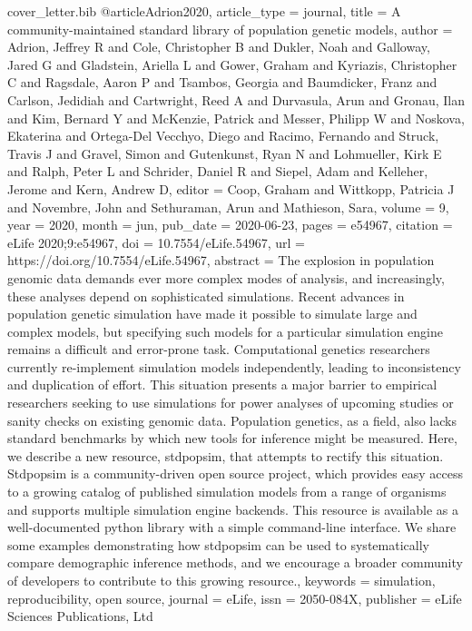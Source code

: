 \begin{filecontents}{cover_letter.bib}
@article{Adrion2020,
  article_type = {journal},
  title        = {A community-maintained standard library of population genetic models},
  author       = {Adrion, Jeffrey R and Cole, Christopher B and Dukler, Noah and Galloway, Jared G and Gladstein, Ariella L and Gower, Graham and Kyriazis, Christopher C and Ragsdale, Aaron P and Tsambos, Georgia and Baumdicker, Franz and Carlson, Jedidiah and Cartwright, Reed A and Durvasula, Arun and Gronau, Ilan and Kim, Bernard Y and McKenzie, Patrick and Messer, Philipp W and Noskova, Ekaterina and Ortega-Del Vecchyo, Diego and Racimo, Fernando and Struck, Travis J and Gravel, Simon and Gutenkunst, Ryan N and Lohmueller, Kirk E and Ralph, Peter L and Schrider, Daniel R and Siepel, Adam and Kelleher, Jerome and Kern, Andrew D},
  editor       = {Coop, Graham and Wittkopp, Patricia J and Novembre, John and Sethuraman, Arun and Mathieson, Sara},
  volume       = 9,
  year         = 2020,
  month        = {jun},
  pub_date     = {2020-06-23},
  pages        = {e54967},
  citation     = {eLife 2020;9:e54967},
  doi          = {10.7554/eLife.54967},
  url          = {https://doi.org/10.7554/eLife.54967},
  abstract     = {The explosion in population genomic data demands ever more complex modes of analysis, and increasingly, these analyses depend on sophisticated simulations. Recent advances in population genetic simulation have made it possible to simulate large and complex models, but specifying such models for a particular simulation engine remains a difficult and error-prone task. Computational genetics researchers currently re-implement simulation models independently, leading to inconsistency and duplication of effort. This situation presents a major barrier to empirical researchers seeking to use simulations for power analyses of upcoming studies or sanity checks on existing genomic data. Population genetics, as a field, also lacks standard benchmarks by which new tools for inference might be measured. Here, we describe a new resource, stdpopsim, that attempts to rectify this situation. Stdpopsim is a community-driven open source project, which provides easy access to a growing catalog of published simulation models from a range of organisms and supports multiple simulation engine backends. This resource is available as a well-documented python library with a simple command-line interface. We share some examples demonstrating how stdpopsim can be used to systematically compare demographic inference methods, and we encourage a broader community of developers to contribute to this growing resource.},
  keywords     = {simulation, reproducibility, open source},
  journal      = {eLife},
  issn         = {2050-084X},
  publisher    = {eLife Sciences Publications, Ltd}
}
\end{filecontents}

